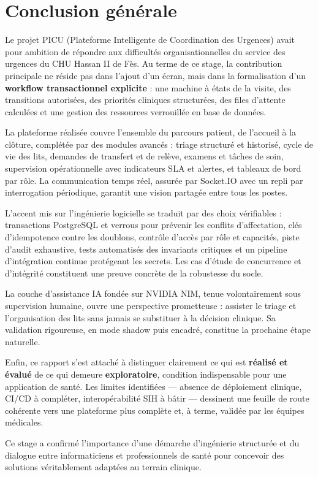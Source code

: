 \chapter*{Conclusion générale}

Le projet PICU (Plateforme Intelligente de Coordination des Urgences) avait pour ambition de répondre aux difficultés organisationnelles du service des urgences du CHU Hassan II de Fès. Au terme de ce stage, la contribution principale ne réside pas dans l'ajout d'un écran, mais dans la formalisation d'un \textbf{workflow transactionnel explicite} : une machine à états de la visite, des transitions autorisées, des priorités cliniques structurées, des files d'attente calculées et une gestion des ressources verrouillée en base de données.

La plateforme réalisée couvre l'ensemble du parcours patient, de l'accueil à la clôture, complétée par des modules avancés : triage structuré et historisé, cycle de vie des lits, demandes de transfert et de relève, examens et tâches de soin, supervision opérationnelle avec indicateurs SLA et alertes, et tableaux de bord par rôle. La communication temps réel, assurée par Socket.IO avec un repli par interrogation périodique, garantit une vision partagée entre tous les postes.

L'accent mis sur l'ingénierie logicielle se traduit par des choix vérifiables : transactions PostgreSQL et verrous pour prévenir les conflits d'affectation, clés d'idempotence contre les doublons, contrôle d'accès par rôle et capacités, piste d'audit exhaustive, tests automatisés des invariants critiques et un pipeline d'intégration continue protégeant les secrets. Les cas d'étude de concurrence et d'intégrité constituent une preuve concrète de la robustesse du socle.

La couche d'assistance IA fondée sur NVIDIA NIM, tenue volontairement sous supervision humaine, ouvre une perspective prometteuse : assister le triage et l'organisation des lits sans jamais se substituer à la décision clinique. Sa validation rigoureuse, en mode shadow puis encadré, constitue la prochaine étape naturelle.

Enfin, ce rapport s'est attaché à distinguer clairement ce qui est \textbf{réalisé et évalué} de ce qui demeure \textbf{exploratoire}, condition indispensable pour une application de santé. Les limites identifiées — absence de déploiement clinique, CI/CD à compléter, interopérabilité SIH à bâtir — dessinent une feuille de route cohérente vers une plateforme plus complète et, à terme, validée par les équipes médicales.

Ce stage a confirmé l'importance d'une démarche d'ingénierie structurée et du dialogue entre informaticiens et professionnels de santé pour concevoir des solutions véritablement adaptées au terrain clinique.
